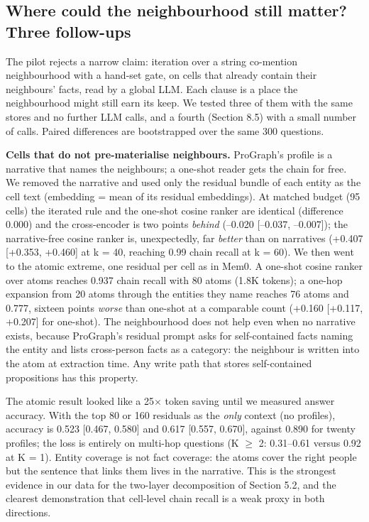 \documentclass[11pt]{article}
\begin{document}
\subsection{Where could the neighbourhood still matter? Three follow-ups}

The pilot rejects a narrow claim: iteration over a string co-mention neighbourhood with a hand-set gate, on cells that already contain their neighbours' facts, read by a global LLM. Each clause is a place the neighbourhood might still earn its keep. We tested three of them with the same stores and no further LLM calls, and a fourth (Section 8.5) with a small number of calls. Paired differences are bootstrapped over the same 300 questions.

\textbf{Cells that do not pre-materialise neighbours.} ProGraph's profile is a narrative that names the neighbours; a one-shot reader gets the chain for free. We removed the narrative and used only the residual bundle of each entity as the cell text (embedding = mean of its residual embeddings). At matched budget (95 cells) the iterated rule and the one-shot cosine ranker are identical (difference 0.000) and the cross-encoder is two points \emph{behind} (--0.020 [--0.037, --0.007]); the narrative-free cosine ranker is, unexpectedly, far \emph{better} than on narratives (+0.407 [+0.353, +0.460] at k = 40, reaching 0.99 chain recall at k = 60). We then went to the atomic extreme, one residual per cell as in Mem0. A one-shot cosine ranker over atoms reaches 0.937 chain recall with 80 atoms (1.8K tokens); a one-hop expansion from 20 atoms through the entities they name reaches 76 atoms and 0.777, sixteen points \emph{worse} than one-shot at a comparable count (+0.160 [+0.117, +0.207] for one-shot). The neighbourhood does not help even when no narrative exists, because ProGraph's residual prompt asks for self-contained facts naming the entity and lists cross-person facts as a category: the neighbour is written into the atom at extraction time. Any write path that stores self-contained propositions has this property.

The atomic result looked like a 25$\times$ token saving until we measured answer accuracy. With the top 80 or 160 residuals as the \emph{only} context (no profiles), accuracy is 0.523 [0.467, 0.580] and 0.617 [0.557, 0.670], against 0.890 for twenty profiles; the loss is entirely on multi-hop questions (K $\geq$ 2: 0.31--0.61 versus 0.92 at K = 1). Entity coverage is not fact coverage: the atoms cover the right people but the sentence that links them lives in the narrative. This is the strongest evidence in our data for the two-layer decomposition of Section 5.2, and the clearest demonstration that cell-level chain recall is a weak proxy in both directions.
\end{document}
